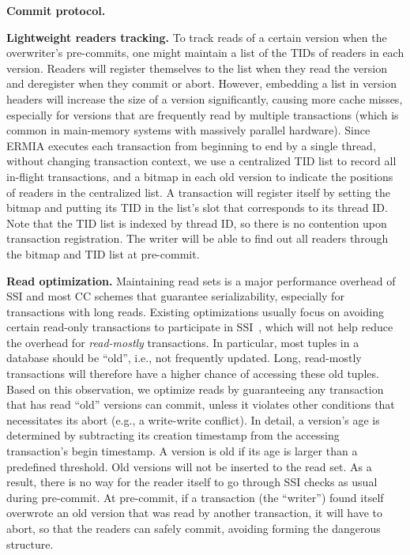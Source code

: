 {\bf Commit protocol.} 

{\bf Lightweight readers tracking.}
To track reads of a certain version when the overwriter's pre-commits, one might maintain a list of the TIDs of readers in each version. Readers will register themselves to the list when they read the version and deregister when they commit or abort. However, embedding a list in version headers will increase the size of a version significantly, causing more cache misses, especially for versions that are frequently read by multiple transactions (which is common in main-memory systems with massively parallel hardware). Since ERMIA executes each transaction from beginning to end by a single thread, without changing transaction context, we use a centralized TID list to record all in-flight transactions, and a bitmap in each old version to indicate the positions of readers in the centralized list. A transaction will register itself by setting the bitmap and putting its TID in the list's slot that corresponds to its thread ID. Note that the TID list is indexed by thread ID, so there is no contention upon transaction registration. The writer will be able to find out all readers through the bitmap and TID list at pre-commit.

{\bf Read optimization.}
Maintaining read sets is a major performance overhead of SSI and most CC schemes that guarantee serializability, especially for transactions with long reads. Existing optimizations usually focus on avoiding certain read-only transactions to participate in SSI~\cite{PortsG12}, which will not help reduce the overhead for \textit{read-mostly} transactions. In particular, most tuples in a database should be ``old'', i.e., not frequently updated. Long, read-mostly transactions will therefore have a higher chance of accessing these old tuples. Based on this observation, we optimize reads by guaranteeing any transaction that has read ``old'' versions can commit, unless it violates other conditions that necessitates its abort (e.g., a write-write conflict). In detail, a version's age is determined by subtracting its creation timestamp from the accessing transaction's begin timestamp. A version is old if its age is larger than a predefined threshold. Old versions will not be inserted to the read set. As a result, there is no way for the reader itself to go through SSI checks as usual during pre-commit. At pre-commit, if a transaction (the ``writer'') found itself overwrote an old version that was read by another transaction, it will have to abort, so that the readers can safely commit, avoiding forming the dangerous structure.

